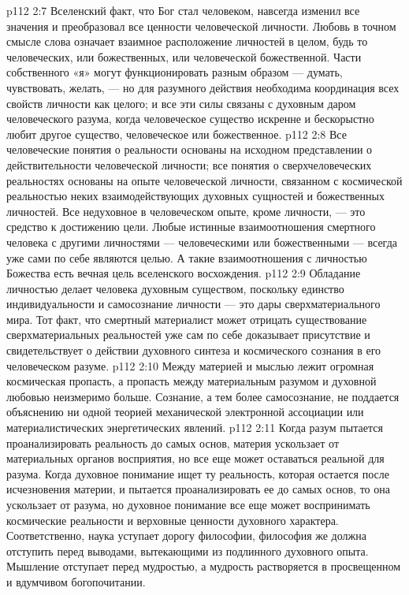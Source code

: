 \vs p112 2:7 \pc Вселенский факт, что Бог стал человеком, навсегда изменил все значения и преобразовал все ценности человеческой личности. Любовь в точном смысле слова означает взаимное расположение личностей в целом, будь то человеческих, или божественных, или человеческой  божественной. Части собственного «я» могут функционировать разным образом --- думать, чувствовать, желать, --- но для разумного действия необходима координация всех свойств личности как целого; и все эти силы связаны с духовным даром человеческого разума, когда человеческое существо искренне и бескорыстно любит другое существо, человеческое или божественное.
\vs p112 2:8 Все человеческие понятия о реальности основаны на исходном представлении о действительности человеческой личности; все понятия о сверхчеловеческих реальностях основаны на опыте человеческой личности, связанном с космической реальностью неких взаимодействующих духовных сущностей и божественных личностей. Все недуховное в человеческом опыте, кроме личности, --- это средство к достижению цели. Любые истинные взаимоотношения смертного человека с другими личностями --- человеческими или божественными --- всегда уже сами по себе являются целью. А такие взаимоотношения с личностью Божества есть вечная цель вселенского восхождения.
\vs p112 2:9 Обладание личностью делает человека духовным существом, поскольку единство индивидуальности и самосознание личности --- это дары сверхматериального мира. Тот факт, что смертный материалист может отрицать существование сверхматериальных реальностей уже сам по себе доказывает присутствие и свидетельствует о действии духовного синтеза и космического сознания в его человеческом разуме.
\vs p112 2:10 Между материей и мыслью лежит огромная космическая пропасть, а пропасть между материальным разумом и духовной любовью неизмеримо больше. Сознание, а тем более самосознание, не поддается объяснению ни одной теорией механической электронной ассоциации или материалистических энергетических явлений.
\vs p112 2:11 \pc Когда разум пытается проанализировать реальность до самых основ, материя ускользает от материальных органов восприятия, но все еще может оставаться реальной для разума. Когда духовное понимание ищет ту реальность, которая остается после исчезновения материи, и пытается проанализировать ее до самых основ, то она ускользает от разума, но духовное понимание все еще может воспринимать космические реальности и верховные ценности духовного характера. Соответственно, наука уступает дорогу философии, философия же должна отступить перед выводами, вытекающими из подлинного духовного опыта. Мышление отступает перед мудростью, а мудрость растворяется в просвещенном и вдумчивом богопочитании.
